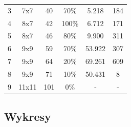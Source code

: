 \documentclass{article}
\begin{document}
\begin{table}[H]
{\begin{tabular}{cccccc}
3                    & 7x7                         & 40                                                           & 70\%                                                      & 5.218                                                                 & 184                                                                 \\
4                    & 8x7                         & 42                                                           & 100\%                                                     & 6.712                                                                 & 171                                                                 \\
5                    & 8x7                         & 46                                                           & 80\%                                                      & 9.900                                                                 & 311                                                                 \\
6                    & 9x9                         & 59                                                           & 70\%                                                      & 53.922                                                                & 307                                                                 \\
7                    & 9x9                         & 64                                                           & 20\%                                                      & 69.261                                                                & 609                                                                 \\
8                    & 9x9                         & 71                                                           & 10\%                                                      & 50.431                                                                & 8                                                                   \\
9                    & 11x11                       & 101                                                          & 0\%                                                       & -                                                                     & -
\end{tabular}%
}
\end{table}

\subsection{Wykresy}
\end{document}
